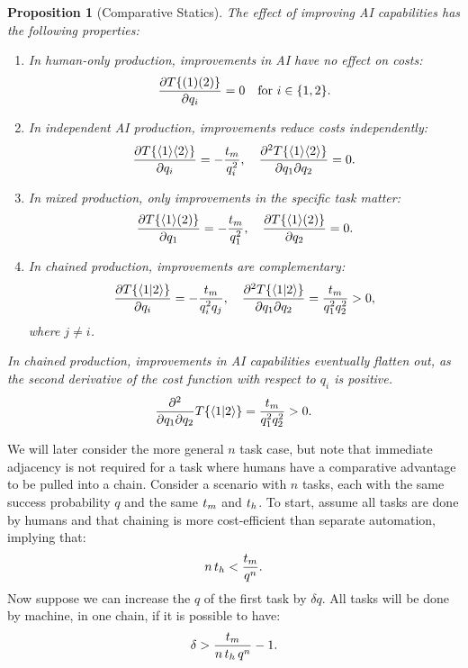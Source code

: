 \documentclass{article}
\theoremstyle{plain}
\theoremstyle{plain}
\newtheorem{proposition}[theorem]{Proposition}
\begin{document}
\begin{proposition}[Comparative Statics] \label{prop:comparative_statics}
  The effect of improving AI capabilities has the following properties:
  \begin{enumerate}
  \item In human-only production, improvements in AI have no effect on costs:
  \[
  \frac{\partial T\{ ( 1 )( 2 ) \}}{\partial q_i} = 0 \quad \text{for } i \in \{1,2\}.
  \]
  \item In independent AI production, improvements reduce costs independently:
  \[
  \frac{\partial T\{ \langle 1 \rangle\langle 2 \rangle \}}{\partial q_i} = -\frac{t_{m}}{q_i^2}, \quad \frac{\partial^2 T\{ \langle 1 \rangle\langle 2 \rangle \}}{\partial q_1 \partial q_2} = 0.
  \]
  \item In mixed production, only improvements in the specific task matter:
  \[
  \frac{\partial T\{ \langle 1 \rangle( 2 ) \}}{\partial q_1} = -\frac{t_{m}}{q_1^2}, \quad \frac{\partial T\{ \langle 1 \rangle( 2 ) \}}{\partial q_2} = 0.
  \]
  \item In chained production, improvements are complementary:
  \[
  \frac{\partial T\{ \langle 1|2 \rangle \}}{\partial q_i} = -\frac{t_{m}}{q_i^2 q_j}, \quad \frac{\partial^2 T\{ \langle 1|2 \rangle \}}{\partial q_1 \partial q_2} = \frac{t_{m}}{q_1^2 q_2^2} > 0,
  \]
  where \(j \neq i\).
  \end{enumerate}

  In chained production, improvements in AI capabilities eventually flatten out, as the second derivative of the cost function with respect to \(q_i\) is positive.
  \begin{equation}
      \frac{\partial^2}{\partial q_1 \partial q_2} T\{ \langle 1|2 \rangle \} = \frac{t_{m}}{q_1^2 q_2^2} > 0.
  \end{equation}

\end{proposition}
 
We will later consider the more general \(n\) task case, but note that immediate adjacency is not required for a task where humans have a comparative advantage to be pulled into a chain.
Consider a scenario with \(n\) tasks, each with the same success probability \(q\) and the same \(t_{m}\) and \(t_{h}\).
To start, assume all tasks are done by humans and that chaining is more cost-efficient than separate automation, implying that:
\[
n\, t_{h} < \frac{t_{m}}{q^n}.
\]
Now suppose we can increase the \(q\) of the first task by \(\delta q\). 
All tasks will be done by machine, in one chain, if it is possible to have:
\begin{align}
  \delta > \frac{t_{m}}{n\, t_{h}{}\, q^{n}} - 1.
\end{align} 
\end{document}
